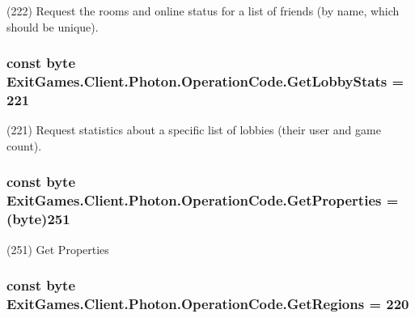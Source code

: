 (222) Request the rooms and online status for a list of friends (by name, which should be unique).

\subsubsection[{\texorpdfstring{Get\+Lobby\+Stats}{GetLobbyStats}}]{\setlength{\rightskip}{0pt plus 5cm}const byte Exit\+Games.\+Client.\+Photon.\+Operation\+Code.\+Get\+Lobby\+Stats = 221}\hypertarget{class_exit_games_1_1_client_1_1_photon_1_1_operation_code_ab495c557979c0d0bae83444712ce8acc}{}\label{class_exit_games_1_1_client_1_1_photon_1_1_operation_code_ab495c557979c0d0bae83444712ce8acc}


(221) Request statistics about a specific list of lobbies (their user and game count).

\subsubsection[{\texorpdfstring{Get\+Properties}{GetProperties}}]{\setlength{\rightskip}{0pt plus 5cm}const byte Exit\+Games.\+Client.\+Photon.\+Operation\+Code.\+Get\+Properties = (byte)251}\hypertarget{class_exit_games_1_1_client_1_1_photon_1_1_operation_code_a7bfd447d57b228deb49cf59b9d442047}{}\label{class_exit_games_1_1_client_1_1_photon_1_1_operation_code_a7bfd447d57b228deb49cf59b9d442047}


(251) Get Properties

\subsubsection[{\texorpdfstring{Get\+Regions}{GetRegions}}]{\setlength{\rightskip}{0pt plus 5cm}const byte Exit\+Games.\+Client.\+Photon.\+Operation\+Code.\+Get\+Regions = 220}\hypertarget{class_exit_games_1_1_client_1_1_photon_1_1_operation_code_a47ec5b6ce3097f6c31a440d679a39bd5}{}\label{class_exit_games_1_1_client_1_1_photon_1_1_operation_code_a47ec5b6ce3097f6c31a440d679a39bd5}


